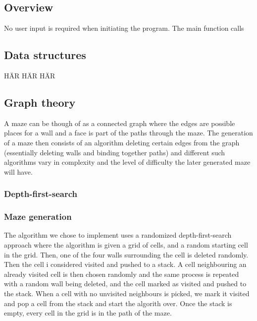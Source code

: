 \documentclass[12pt, a4paper]{article}
\begin{document}
\subsection{Overview}
No user input is required when initiating the program. The main function calls 

\subsection{Data structures}
HÄR HÄR HÄR 

\subsection{Graph theory}
A maze can be though of as a connected graph where the edges are possible places for a wall and a face is part of the paths through the maze. The generation of a maze then consists of an algorithm deleting certain edges from the graph (essentially deleting walls and binding together paths) and different such algorithms vary in complexity and the level of difficulty the later generated maze will have. 


\subsubsection{Depth-first-search}


\subsubsection{Maze generation}
The algorithm we chose to implement uses a randomized depth-first-search approach where the algorithm is given a grid of cells, and a random starting cell in the grid. Then, one of the four walls surrounding the cell is deleted randomly. Then the cell i considered visited and pushed to a stack. A cell neighbouring an already visited cell is then chosen randomly and the same process is repeated with a random wall being deleted, and the cell marked as visited and pushed to the stack. When a cell with no unvisited neighbours is picked, we mark it visited and pop a cell from the stack and start the algorith over. Once the stack is empty, every cell in the grid is in the path of the maze. 



    
\end{document}
